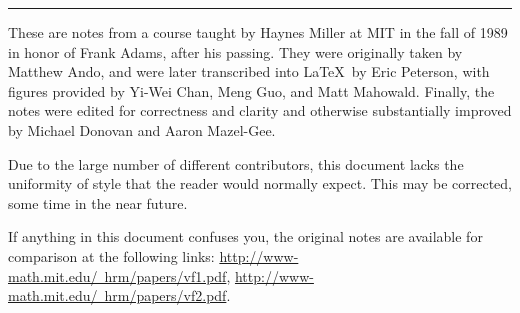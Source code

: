 
\ifx\OutputFrontMatter\undefined\hrule\else
\maketitle
\tableofcontents
\newpage
\fi

\ifx\OutputForeword\undefined\else
These are notes from a course taught by Haynes Miller at MIT in the fall of 1989 in honor of Frank Adams, after his passing.  They were originally taken by Matthew Ando, and were later transcribed into \LaTeX\ by Eric Peterson, with figures provided by Yi-Wei Chan, Meng Guo, and Matt Mahowald. Finally, the notes were edited for correctness and clarity and otherwise substantially improved by Michael Donovan and Aaron Mazel-Gee.

Due to the large number of different contributors, this document lacks the uniformity of style that the reader would normally expect. This may be corrected, some time in the near future.

If anything in this document confuses you, the original notes are available for comparison at the following links: \href{http://www-math.mit.edu/~hrm/papers/vf1.pdf}{http://www-math.mit.edu/\string~hrm/papers/vf1.pdf}, \href{http://www-math.mit.edu/~hrm/papers/vf2.pdf}{http://www-math.mit.edu/\string~hrm/papers/vf2.pdf}.

\fi

